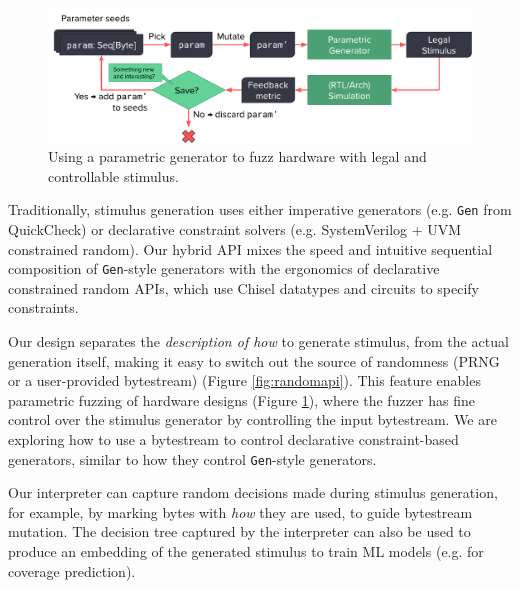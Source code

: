 \documentclass[sigplan,review,nonacm,9pt]{acmart}
\begin{document}
\begin{figure}[b]
\includegraphics[width=\linewidth]{fuzzing/parametric_fuzzing_hw.pdf}
\caption{Using a parametric generator to fuzz hardware with legal and controllable stimulus.}
\label{fig:parametric_fuzzing}
\end{figure}

Traditionally, stimulus generation uses either imperative generators (e.g. \texttt{Gen} from QuickCheck\cite{quickcheck}) or declarative constraint solvers (e.g. SystemVerilog + UVM constrained random\cite{riscv_dv}).
Our hybrid API mixes the speed and intuitive sequential composition of \texttt{Gen}-style generators with the ergonomics of declarative constrained random APIs, which use Chisel datatypes and circuits to specify constraints.

Our design separates the \textit{description of how} to generate stimulus, from the actual generation itself, making it easy to switch out the source of randomness (PRNG or a user-provided bytestream) (Figure \ref{fig:randomapi}).
This feature enables parametric fuzzing\cite{zest} of hardware designs (Figure \ref{fig:parametric_fuzzing}), where the fuzzer has fine control over the stimulus generator by controlling the input bytestream.
We are exploring how to use a bytestream to control declarative constraint-based generators, similar to how they control \texttt{Gen}-style generators.

Our interpreter can capture random decisions made during stimulus generation, for example, by marking bytes with \textit{how} they are used, to guide bytestream mutation.
The decision tree captured by the interpreter can also be used to produce an embedding of the generated stimulus to train ML models (e.g. for coverage prediction).
\end{document}
